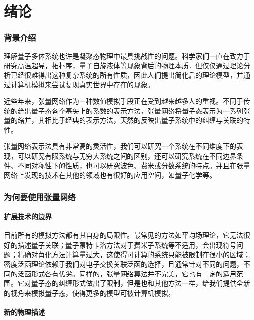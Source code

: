 
\chapter{绪论}

\subsection{背景介绍}

理解量子多体系统也许是凝聚态物理中最具挑战性的问题。科学家们一直在致力于研究高温超导，拓扑序，量子自旋液体等现象背后的物理本质，但仅仅通过理论分析已经很难得出这种复杂系统的所有性质，因此人们提出简化后的理论模型，并通过计算机模拟来尝试复现真实世界中存在的现象。

近些年来，张量网络作为一种数值模拟手段正在受到越来越多人的重视。不同于传统的给出量子态各个基矢上的系数的表示方法，张量网络将量子态表示为一系列张量的缩并，其相比于经典的表示方法，天然的反映出量子系统中的纠缠与关联的特性。

张量网络表示法具有非常高的灵活性，我们可以研究一个系统在不同维度下的表现，可以研究有限系统与无穷大系统之间的区别，还可以研究系统在不同边界条件、不同对称性下的性质，也可以研究波色、费米或分数系统的特点。并且在张量网络上发现的技术在其他的领域也有很好的应用空间，如量子化学等。

\subsection{为何要使用张量网络}

\subsubsection{扩展技术的边界}

目前所有的模拟方法都有其自身的局限性。最常见的方法如平均场理论\cite{vedralMeanfieldApproximationsMultipartite2004}，它无法很好的描述量子关联；量子蒙特卡洛方法\cite{QMC1999}对于费米子系统等不适用，会出现符号问题；精确对角化方法\cite{2012lanczos}计算量过大，这使得可计算的系统只能被限制在很小的区域；密度泛函理论\cite{dengDensityFunctionalTheory2014}依赖于我们对电子交换关联泛函的选择，且通常针对不同的问题，不同的泛函形式各有优劣。同样的，张量网络算法并不完美，它也有一定的适用范围。它对量子态的纠缠形式做出了限制，但是也和其他方法一样，给我们提供全新的视角来模拟量子态，使得更多的模型可被计算机模拟。

\subsubsection{新的物理描述}

